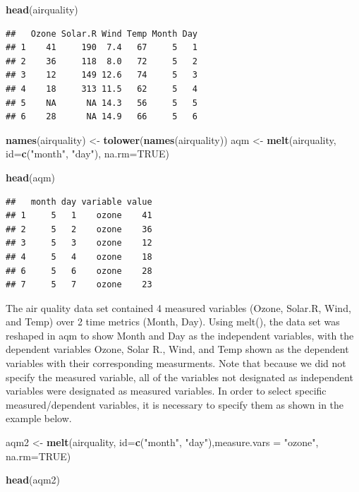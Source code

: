 \documentclass[]{book}
\newenvironment{Shaded}{\begin{snugshade}}{\end{snugshade}}
\newcommand{\DataTypeTok}[1]{\textcolor[rgb]{0.13,0.29,0.53}{#1}}
\newcommand{\KeywordTok}[1]{\textcolor[rgb]{0.13,0.29,0.53}{\textbf{#1}}}
\newcommand{\NormalTok}[1]{#1}
\newcommand{\OtherTok}[1]{\textcolor[rgb]{0.56,0.35,0.01}{#1}}
\newcommand{\StringTok}[1]{\textcolor[rgb]{0.31,0.60,0.02}{#1}}
\begin{document}
\begin{Shaded}
\begin{Highlighting}[]
\KeywordTok{head}\NormalTok{(airquality)}
\end{Highlighting}
\end{Shaded}

\begin{verbatim}
##   Ozone Solar.R Wind Temp Month Day
## 1    41     190  7.4   67     5   1
## 2    36     118  8.0   72     5   2
## 3    12     149 12.6   74     5   3
## 4    18     313 11.5   62     5   4
## 5    NA      NA 14.3   56     5   5
## 6    28      NA 14.9   66     5   6
\end{verbatim}

\begin{Shaded}
\begin{Highlighting}[]
\KeywordTok{names}\NormalTok{(airquality) <-}\StringTok{ }\KeywordTok{tolower}\NormalTok{(}\KeywordTok{names}\NormalTok{(airquality))}
\NormalTok{aqm <-}\StringTok{ }\KeywordTok{melt}\NormalTok{(airquality, }\DataTypeTok{id=}\KeywordTok{c}\NormalTok{(}\StringTok{"month"}\NormalTok{, }\StringTok{"day"}\NormalTok{), }\DataTypeTok{na.rm=}\OtherTok{TRUE}\NormalTok{)}

\KeywordTok{head}\NormalTok{(aqm)}
\end{Highlighting}
\end{Shaded}

\begin{verbatim}
##   month day variable value
## 1     5   1    ozone    41
## 2     5   2    ozone    36
## 3     5   3    ozone    12
## 4     5   4    ozone    18
## 6     5   6    ozone    28
## 7     5   7    ozone    23
\end{verbatim}

The air quality data set contained 4 measured variables (Ozone, Solar.R, Wind, and Temp) over 2 time metrics (Month, Day). Using melt(), the data set was reshaped in aqm to show Month and Day as the independent variables, with the dependent variables Ozone, Solar R., Wind, and Temp shown as the dependent variables with their corresponding measurments. Note that because we did not specify the measured variable, all of the variables not designated as independent variables were designated as measured variables. In order to select specific measured/dependent variables, it is necessary to specify them as shown in the example below.

\begin{Shaded}
\begin{Highlighting}[]
\NormalTok{aqm2 <-}\StringTok{ }\KeywordTok{melt}\NormalTok{(airquality, }\DataTypeTok{id=}\KeywordTok{c}\NormalTok{(}\StringTok{"month"}\NormalTok{, }\StringTok{"day"}\NormalTok{),}\DataTypeTok{measure.vars =} \StringTok{"ozone"}\NormalTok{, }\DataTypeTok{na.rm=}\OtherTok{TRUE}\NormalTok{)}

\KeywordTok{head}\NormalTok{(aqm2)}
\end{Highlighting}
\end{Shaded}
\end{document}
